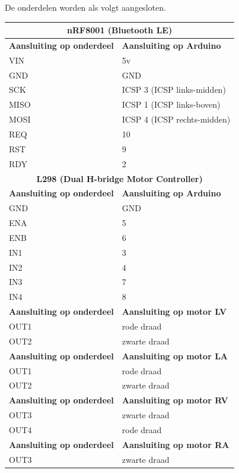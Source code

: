 \documentclass[12pt,a4paper]{article}
\begin{document}
\newpage
	De onderdelen worden als volgt aangesloten.			
	\begin{table}[H]
		\begin{tabularx}{\textwidth}{|X|X|}	
			\hline \multicolumn{2}{|c|}{\textbf{nRF8001 (Bluetooth LE)}}	\\	 
			\hline \textbf{Aansluiting op onderdeel} & \textbf{Aansluiting op Arduino} \\
			\hline VIN & 5v \\
			\hline GND & GND \\
			\hline SCK &  ICSP 3 (ICSP links-midden)\\
			\hline MISO & ICSP 1 (ICSP links-boven)\\
			\hline MOSI & ICSP 4 (ICSP rechts-midden)\\
			\hline REQ & 10 \\
			\hline RST & 9 \\
			\hline RDY & 2 \\
			\hline \multicolumn{2}{|c|}{\textbf{L298 (Dual H-bridge Motor Controller)}}	\\	 
			\hline \textbf{Aansluiting op onderdeel} & \textbf{Aansluiting op Arduino} \\
			\hline GND & GND \\
			\hline ENA & 5  \\
			\hline ENB & 6 \\
			\hline IN1 & 3 \\
			\hline IN2 & 4 \\
			\hline IN3 & 7 \\
			\hline IN4 & 8 \\
			\hline \textbf{Aansluiting op onderdeel} & \textbf{Aansluiting op motor LV} \\
			\hline OUT1 & rode draad \\
			\hline OUT2 & zwarte draad \\
			\hline \textbf{Aansluiting op onderdeel} & \textbf{Aansluiting op motor LA} \\
			\hline OUT1 & rode draad \\
			\hline OUT2 & zwarte draad \\
			\hline \textbf{Aansluiting op onderdeel} & \textbf{Aansluiting op motor RV} \\
			\hline OUT3 & zwarte draad \\
			\hline OUT4 & rode draad \\
			\hline \textbf{Aansluiting op onderdeel} & \textbf{Aansluiting op motor RA} \\
			\hline OUT3 & zwarte draad \\

\end{tabularx}
\end{table}
\end{document}
